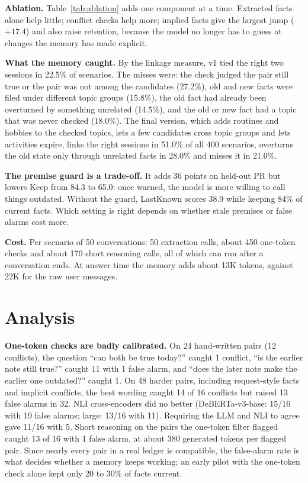 \documentclass[10pt,twocolumn]{article}
\begin{document}
\textbf{Ablation.} Table~\ref{tab:ablation} adds one component at a time. Extracted facts alone help little;
conflict checks help more; implied facts give the largest jump ($+17.4$) and also raise retention, because the model
no longer has to guess at changes the memory has made explicit.

\textbf{What the memory caught.} By the linkage measure, v1 tied the right two sessions in 22.5\% of scenarios. The
misses were: the check judged the pair still true or the pair was not among the candidates (27.2\%), old and new facts
were filed under different topic groups (15.8\%), the old fact had already been overturned by something unrelated
(14.5\%), and the old or new fact had a topic that was never checked (18.0\%). The final version, which adds routines
and hobbies to the checked topics, lets a few candidates cross topic groups and lets activities expire, links the right
sessions in 51.0\% of all 400 scenarios, overturns the old state only through unrelated facts in 28.0\% and misses it
in 21.0\%.

\textbf{The premise guard is a trade-off.} It adds 36 points on held-out PR but lowers Keep from 84.3 to 65.0: once
warned, the model is more willing to call things outdated. Without the guard, LastKnown scores 38.9 while keeping 84\%
of current facts. Which setting is right depends on whether stale premises or false alarms cost more.

\textbf{Cost.} Per scenario of 50 conversations: 50 extraction calls, about 450 one-token checks and about 170 short
reasoning calls, all of which can run after a conversation ends. At answer time the memory adds about 13K tokens,
against 22K for the raw user messages.

\section{Analysis}

\textbf{One-token checks are badly calibrated.} On 24 hand-written pairs (12 conflicts), the question ``can both be
true today?'' caught 1 conflict, ``is the earlier note still true?'' caught 11 with 1 false alarm, and ``does the later
note make the earlier one outdated?'' caught 1. On 48 harder pairs, including request-style facts and implicit
conflicts, the best wording caught 14 of 16 conflicts but raised 13 false alarms in 32. NLI cross-encoders did no
better (DeBERTa-v3-base: 15/16 with 19 false alarms; large: 13/16 with 11). Requiring the LLM and NLI to agree gave
11/16 with 5. Short reasoning on the pairs the one-token filter flagged caught 13 of 16 with 1 false alarm, at about
380 generated tokens per flagged pair. Since nearly every pair in a real ledger is compatible, the false-alarm rate is
what decides whether a memory keeps working; an early pilot with the one-token check alone kept only 20 to 30\% of
facts current.
\end{document}
